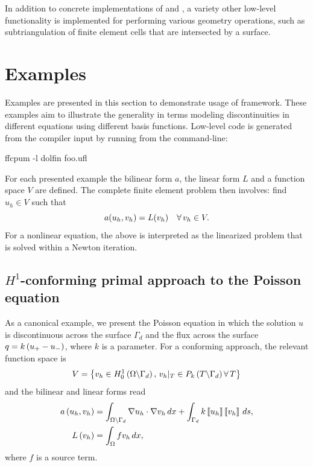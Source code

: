 In addition to concrete implementations of  and
, a variety other low-level functionality is
implemented for performing various geometry operations, such as
subtriangulation of finite element cells that are intersected by
a surface.

\section{Examples}
\label{sec:nikbakht:examples}

Examples are presented in this section to demonstrate usage of
framework.  These examples aim to illustrate the generality in terms
modeling discontinuities in different equations using different basis
functions. Low-level code is generated from the compiler input by running
from the command-line:
%
\begin{bash}
ffcpum -l dolfin foo.ufl
\end{bash}

For each presented example the bilinear form $a$, the linear form $L$
and a function space $V$ are defined. The complete finite element problem
then involves: find $u_{h} \in V$ such that
%
\begin{equation}
  a(u_{h}, v_{h}) = L(v_{h}) \quad \forall\, v_{h} \in V.
\end{equation}
%
For a nonlinear equation, the above is interpreted as the linearized
problem that is solved within a Newton iteration.

\subsection{$H^{1}$-conforming primal approach to the Poisson equation}
%
As a canonical example, we present the Poisson equation in which the solution
$u$ is discontinuous across the surface $\Gamma_{d}$ and the flux across the
surface $ q = k\left( {u_{+} - u_{-}} \right)$, where $k$ is a parameter.
For a conforming approach, the relevant function space is
%
\begin{equation}
  V = \left\{ {v_{h} \in H_{0}^{1}\left( {\Omega \backslash \Gamma_{d}} \right), \,
          v_{h}|_{T} \in P_{k}\left( {T \backslash \Gamma_{d}} \right) \forall\, T} \right\}
\label{eqn:nikbakht:compact_discontinuous_space}
\end{equation}
%
and the bilinear and linear forms read
%
\begin{align}
  a\left( {u_{h}, v_{h}} \right)
     &= \int_{\Omega \backslash  \Gamma_d} \nabla u_{h} \cdot \nabla v_{h} \, d x
       + \int_{\Gamma_{d}} k \left\llbracket {u_{h}} \right\rrbracket \left\llbracket {v_{h}} \right\rrbracket  \, d s,
\label{eqn:nikbakht:poisson_xfem_a}
\\
  L\left( {v_{h}} \right) &= \int_{\Omega} f v_{h} \, d x,
\label{eqn:nikbakht:poisson_xfem_L}
\end{align}
%
where $f$ is a source term.

